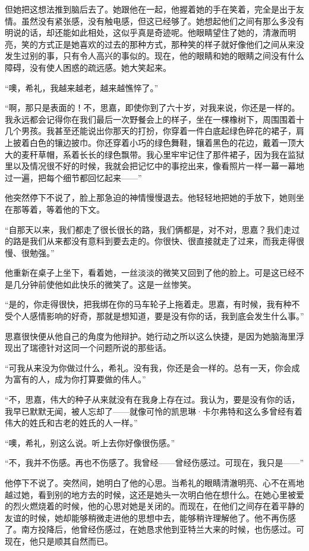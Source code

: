 \par 但她把这想法推到脑后去了。她跟他在一起，他握着她的手在笑着，完全是出于友情。虽然没有紧张感，没有触电感，但这已经够了。她想起他们之间有那么多没有明说的话，却还能如此相处，这似乎真是奇迹呢。他眼睛望住了她的，清澈而明亮，笑的方式正是她喜欢的过去的那种方式，那种笑的样子就好像他们之间从来没发生过别的事，只有令人高兴的事似的。现在，他的眼睛和她的眼睛之间没有什么障碍，没有使人困惑的疏远感。她大笑起来。
\par “噢，希礼，我越来越老，越来越憔悴了。”
\par “啊，那只是表面的！不，思嘉，即使你到了六十岁，对我来说，你还是一样的。我永远都会记得你在我们最后一次野餐会上的样子，坐在一棵橡树下，周围围着十几个男孩。我甚至还能说出你那天的打扮，你穿着一件白底起绿色碎花的裙子，肩上披着白色的镶边披巾。你还穿着小巧的绿色舞鞋，镶着黑色的花边，戴着一顶大大的麦秆草帽，系着长长的绿色飘带。我心里牢牢记住了那件裙子，因为我在监狱里以及情况很不好的时候，我就会把记忆中的事挖出来，像看照片一样一幕一幕地过一遍，把每个细节都回忆起来——”
\par 他突然停下不说了，脸上那急迫的神情慢慢退去。他轻轻地把她的手放下，她则坐在那等着，等着他的下文。
\par “自那天以来，我们都走了很长很长的路，我们俩都是，对不对，思嘉？我们走过的路是我们从来都没有意料到要去走的。你很快、很直接就走了过来，而我走得很慢、很勉强。”
\par 他重新在桌子上坐下，看着她，一丝淡淡的微笑又回到了他的脸上。可是这已经不是几分钟前使他如此快乐的微笑了。这是一丝惨笑。
\par “是的，你走得很快，把我绑在你的马车轮子上拖着走。思嘉，有时候，我有种不受个人感情影响的好奇，那就是想知道，要是没有你的话，我到底会发生什么事。”
\par 思嘉很快便从他自己的角度为他辩护。她行动之所以这么快捷，是因为她脑海里浮现出了瑞德针对这同一个问题所说的那些话。
\par “可我从来没为你做过什么，希礼。没有我，你还是会一样的。总有一天，你会成为富有的人，成为你打算要做的伟人。”
\par “不，思嘉，伟大的种子从来就没有在我身上存在过。我认为，要是没有你的话，我早已默默无闻，被人忘却了——就像可怜的凯思琳·卡尔弗特和这么多曾经有着伟大的姓氏和古老的姓氏的人一样。”
\par “噢，希礼，别这么说。听上去你好像很伤感。”
\par “不，我并不伤感。再也不伤感了。我曾经——曾经伤感过。可现在，我只是——”
\par 他停下不说了。突然间，她明白了他的心思。当希礼的眼睛清澈明亮、心不在焉地越过她，看到别的地方去的时候，这还是她头一次明白他在想什么。在她心里被爱的烈火燃烧着的时候，他的心思对她是关闭的。而现在，在他们之间存在着平静的友谊的时候，她却能够稍微走进他的思想中去，能够稍许理解他了。他不再伤感了。南方投降后，他曾经伤感过，在她恳求他到亚特兰大来的时候，也伤感过。可现在，他只是顺其自然而已。
